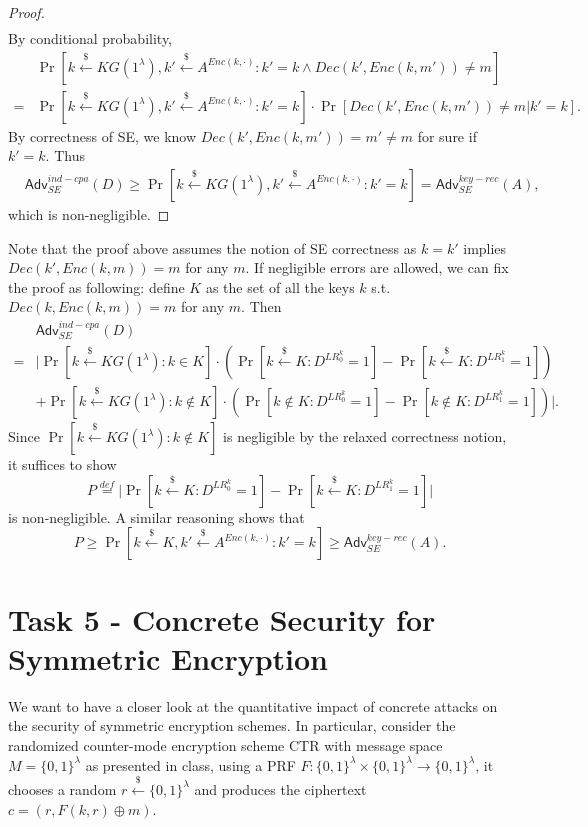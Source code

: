 \documentclass[12pt]{article}
\newcommand{\eqdef}{\stackrel{def}{=}}
\newcommand{\bits}{\{0,1\}}
\newcommand{\getsr}{\stackrel{\$}{\gets}}
\newcommand{\Adv}{\textsf{Adv}}
\theoremstyle{definition}
\begin{document}
\begin{proof}
$$\begin{aligned}
\end{aligned}$$
By conditional probability,
$$\begin{aligned}
&\Pr[k \getsr KG(1^\lambda), k' \getsr A^{Enc(k,\cdot)}: k' = k \wedge Dec(k', Enc(k, m'))\not=m] \\
=&\Pr[k \getsr KG(1^\lambda), k' \getsr A^{Enc(k,\cdot)}: k' = k] \cdot \Pr[Dec(k', Enc(k, m'))\not=m | k' = k].
\end{aligned}$$
By correctness of SE, we know $Dec(k', Enc(k, m')) = m' \not= m$ for sure if $k'=k$. Thus
$$\begin{aligned}
&\Adv_{SE}^{ind-cpa}(D) 
\geq  \Pr[k \getsr KG(1^\lambda), k' \getsr A^{Enc(k,\cdot)}: k' = k] 
= \Adv_{SE}^{key-rec}(A),
\end{aligned}$$
which is non-negligible.
\end{proof}
Note that the proof above assumes the notion of SE correctness as $k=k'$ implies $Dec(k', Enc(k, m)) = m$ for any $m$. If negligible errors are allowed, we can fix the proof as following: define $K$ as the set of all the keys $k$ s.t. $Dec(k, Enc(k, m)) = m$ for any $m$. 
Then
$$\begin{aligned}
&\Adv_{SE}^{ind-cpa}(D) \\
=& \bigg| \Pr[k \getsr KG(1^\lambda) : k \in K]\cdot(\Pr[k\getsr K : D^{LR_0^k}=1] - \Pr[k\getsr K : D^{LR_1^k}=1]) \\
& + \Pr[k \getsr KG(1^\lambda) : k \not\in K]\cdot(\Pr[k\not\in K : D^{LR_0^k}=1] - \Pr[k\not\in K : D^{LR_1^k}=1]) \bigg|.
\end{aligned}$$
Since $\Pr[k \getsr KG(1^\lambda) : k \not\in K]$ is negligible by the relaxed correctness notion, it suffices to show
$$P \eqdef \bigg| \Pr[k\getsr K : D^{LR_0^k}=1] - \Pr[k\getsr K : D^{LR_1^k}=1] \bigg|$$
is non-negligible.
A similar reasoning shows that
$$P
\geq \Pr[k \getsr K, k' \getsr A^{Enc(k,\cdot)}: k' = k] 
\geq \Adv_{SE}^{key-rec}(A).$$

\section{Task 5 - Concrete Security for Symmetric Encryption}
We want to have a closer look at the quantitative impact of concrete attacks on the security
of symmetric encryption schemes. In particular, consider the randomized counter-mode
encryption scheme CTR with message space $M = \bits^\lambda$ as presented in class, using a
PRF $F : \bits^\lambda \times \bits^\lambda \to \bits^\lambda$, it chooses a random $r \getsr \bits^\lambda$
and produces the ciphertext $c = (r, F(k, r) \oplus m)$.
\end{document}
